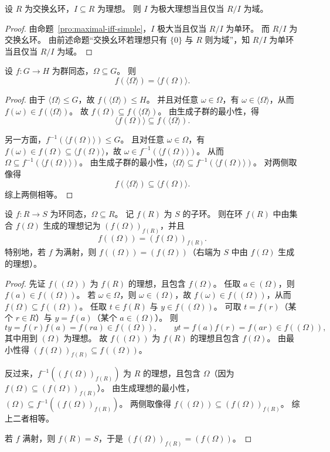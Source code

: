 \documentclass[lang=cn,a4paper,newtx]{elegantbook}
\begin{document}
\begin{corollary}
设 $R$ 为交换幺环，$I\subseteq R$ 为理想。
则 $I$ 为极大理想当且仅当 $R/I$ 为域。
\end{corollary}

\begin{proof}
由命题~\ref{pro:maximal-iff-simple}，$I$ 极大当且仅当 $R/I$ 为单环。
而 $R/I$ 为交换幺环。
由前述命题“交换幺环若理想只有 $\{0\}$ 与 $R$ 则为域”，知 $R/I$ 为单环当且仅当 $R/I$ 为域。
\end{proof}

\begin{proposition}
设 $f:G\to H$ 为群同态，$\Omega\subseteq G$。
则
\[
  f(\langle\Omega\rangle)=\langle f(\Omega)\rangle.
\]
\end{proposition}

\begin{proof}
由于 $\langle\Omega\rangle\le G$，故 $f(\langle\Omega\rangle)\le H$。
并且对任意 $\omega\in \Omega$，有 $\omega\in \langle\Omega\rangle$，从而 $f(\omega)\in f(\langle\Omega\rangle)$。
故 $f(\Omega)\subseteq f(\langle\Omega\rangle)$。
由生成子群的最小性，得
\[
  \langle f(\Omega)\rangle\subseteq f(\langle\Omega\rangle).
\]

另一方面，$f^{-1}(\langle f(\Omega)\rangle)\le G$。
且对任意 $\omega\in \Omega$，有 $f(\omega)\in f(\Omega)\subseteq \langle f(\Omega)\rangle$，故 $\omega\in f^{-1}(\langle f(\Omega)\rangle)$。
从而 $\Omega\subseteq f^{-1}(\langle f(\Omega)\rangle)$。
由生成子群的最小性，$\langle\Omega\rangle\subseteq f^{-1}(\langle f(\Omega)\rangle)$。
对两侧取像得
\[
  f(\langle\Omega\rangle)\subseteq \langle f(\Omega)\rangle.
\]
综上两侧相等。
\end{proof}

\begin{proposition}
设 $f:R\to S$ 为环同态，$\Omega\subseteq R$。
记 $f(R)$ 为 $S$ 的子环。
则在环 $f(R)$ 中由集合 $f(\Omega)$ 生成的理想记为 $(f(\Omega))_{f(R)}$，并且
\[
  f((\Omega))=(f(\Omega))_{f(R)}.
\]
特别地，若 $f$ 为满射，则 $f((\Omega))=(f(\Omega))$（右端为 $S$ 中由 $f(\Omega)$ 生成的理想）。
\end{proposition}

\begin{proof}
先证 $f((\Omega))$ 为 $f(R)$ 的理想，且包含 $f(\Omega)$。
任取 $a\in (\Omega)$，则 $f(a)\in f((\Omega))$。
若 $\omega\in \Omega$，则 $\omega\in (\Omega)$，故 $f(\omega)\in f((\Omega))$，从而 $f(\Omega)\subseteq f((\Omega))$。
任取 $t\in f(R)$ 与 $y\in f((\Omega))$。
可取 $t=f(r)$（某个 $r\in R$）与 $y=f(a)$（某个 $a\in (\Omega)$）。
则
\[
  ty=f(r)f(a)=f(ra)\in f((\Omega)),\qquad yt=f(a)f(r)=f(ar)\in f((\Omega)),
\]
其中用到 $(\Omega)$ 为理想。
故 $f((\Omega))$ 为 $f(R)$ 的理想且包含 $f(\Omega)$。
由最小性得 $(f(\Omega))_{f(R)}\subseteq f((\Omega))$。

反过来，$f^{-1}((f(\Omega))_{f(R)})$ 为 $R$ 的理想，且包含 $\Omega$（因为 $f(\Omega)\subseteq (f(\Omega))_{f(R)}$）。
由生成理想的最小性，$(\Omega)\subseteq f^{-1}((f(\Omega))_{f(R)})$。
两侧取像得 $f((\Omega))\subseteq (f(\Omega))_{f(R)}$。
综上二者相等。

若 $f$ 满射，则 $f(R)=S$，于是 $(f(\Omega))_{f(R)}=(f(\Omega))$。
\end{proof}
\end{document}
